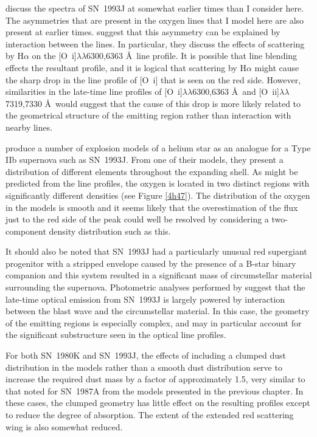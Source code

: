\citet{Houck1996} discuss the spectra of SN~1993J at somewhat earlier times than I consider here.  The asymmetries that are present in the oxygen lines that I model here are also present at earlier times.  \citet{Houck1996} suggest that  this asymmetry can be explained by interaction between the lines.  In particular, they discuss the effects of scattering by H$\alpha$ on the [O~{\sc i}]$\lambda\lambda$6300,6363 \AA\ line profile.  It is possible that line blending effects the resultant profile, and it is logical that scattering by H$\alpha$ might cause the sharp drop in the line profile of [O~{\sc i}] that is seen on the red side.  However, similarities in the late-time line profiles of [O~{\sc i}]$\lambda\lambda$6300,6363 \AA\ and [O~{\sc ii}]$\lambda\lambda$7319,7330 \AA\ would suggest that  the cause of this drop is more likely related to the geometrical structure of the emitting region rather than interaction with nearby lines.

\citet{Nomoto1993} produce a number of explosion models of a helium star as an analogue for a Type IIb supernova such as SN~1993J.  From one of their models, they present a distribution of different elements throughout the expanding shell.  As might be predicted from the line profiles, the oxygen is located in two distinct regions with significantly different densities (see Figure \ref{4h47}).   The distribution of the oxygen in the models is smooth and it seems likely that the overestimation of the flux just to the red side of the peak could well be resolved by considering a two-component density distribution such as this.

It should also be noted that SN~1993J had a particularly unusual red supergiant progenitor with a stripped envelope caused by the presence of a B-star binary companion \citep{Maund2004,Fox2014} and this system resulted in a significant mass of circumstellar material surrounding the supernova.  Photometric analyses performed by \citet{Zhang2004} suggest that the late-time optical emission from SN~1993J is largely powered by interaction between the blast wave and the circumstellar material.  In this case, the geometry of the emitting regions is especially complex, and may in particular account for the significant substructure seen in the optical line profiles.

For both SN~1980K and SN~1993J, the effects of including a clumped dust distribution in the models rather than a smooth dust distribution serve to increase the required dust mass by a factor of approximately 1.5, very similar to that noted for SN~1987A from the models presented in the previous chapter.  In these cases, the clumped geometry has little effect on the resulting profiles except to reduce the degree of absorption.  The extent of the extended red scattering wing is also somewhat reduced.


